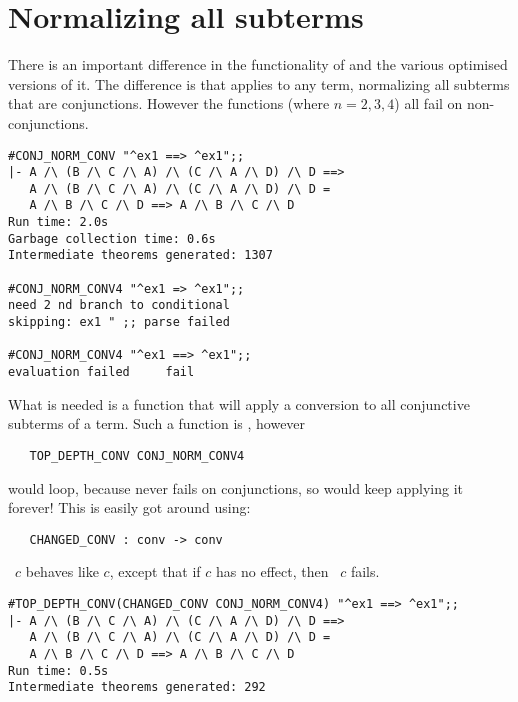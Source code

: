\section{Normalizing all subterms}

There is an important difference in the functionality of
 and the various optimised versions of it. The
difference is that  applies to any term,
normalizing all subterms that are conjunctions. However the functions
 (where {\small $n = 2,3,4$}) all 
fail on non-conjunctions.

\begin{session}\begin{verbatim}
#CONJ_NORM_CONV "^ex1 ==> ^ex1";;
|- A /\ (B /\ C /\ A) /\ (C /\ A /\ D) /\ D ==>
   A /\ (B /\ C /\ A) /\ (C /\ A /\ D) /\ D =
   A /\ B /\ C /\ D ==> A /\ B /\ C /\ D
Run time: 2.0s
Garbage collection time: 0.6s
Intermediate theorems generated: 1307

#CONJ_NORM_CONV4 "^ex1 => ^ex1";;
need 2 nd branch to conditional
skipping: ex1 " ;; parse failed     

#CONJ_NORM_CONV4 "^ex1 ==> ^ex1";;
evaluation failed     fail
\end{verbatim}\end{session}

What is needed is a function that will apply a conversion to all
conjunctive subterms of a term. Such a function is , however

\begin{hol}\begin{verbatim}
   TOP_DEPTH_CONV CONJ_NORM_CONV4
\end{verbatim}\end{hol}

\noindent would loop, because  never fails on
conjunctions, so  would keep applying it forever!
This is easily got around using:

\begin{hol}\begin{verbatim}
   CHANGED_CONV : conv -> conv
\end{verbatim}\end{hol}

\noindent {}~$c$ behaves like $c$, except that if $c$
has no effect, then ~$c$ fails.

\begin{session}\begin{verbatim}
#TOP_DEPTH_CONV(CHANGED_CONV CONJ_NORM_CONV4) "^ex1 ==> ^ex1";;
|- A /\ (B /\ C /\ A) /\ (C /\ A /\ D) /\ D ==>
   A /\ (B /\ C /\ A) /\ (C /\ A /\ D) /\ D =
   A /\ B /\ C /\ D ==> A /\ B /\ C /\ D
Run time: 0.5s
Intermediate theorems generated: 292
\end{verbatim}\end{session}

